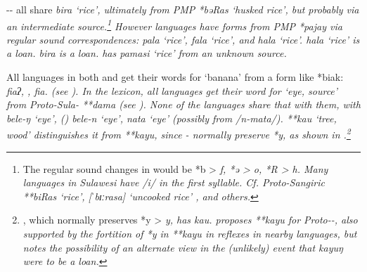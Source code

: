 -- all share \it{bira} ‘rice’,
ultimately from PMP *bəRas ‘husked rice’,
but probably via an intermediate source.\footnote{
		The regular
		sound changes in 
		would be *b > \it{f},
		*ə > \it{o}, *R > \it{h}.
		Many languages in Sulawesi have /i/ in the first syllable. Cf.
		Proto-Sangiric **biRas ‘rice’,  [ˈbɪːrasa] ‘uncooked rice’
		\citep[106]{GrimesGrimes1987}, and others.}
However  languages have forms from
PMP *pajay via regular sound correspondences:  \it{pala}
‘rice’,  \it{fala} ‘rice’, and   \it{hala} ‘rice’.
 \it{hala} ‘rice’ is a  loan.
 \it{bira} is a  loan.
 has \it{pamasi} ‘rice’ from an unknown source.

All languages in both 
and  get their words for ‘banana’ from a form
like *biak:  \it{fiaʔ},
,  \it{fia}. (see ).
In the lexicon, all  languages get their word
for ‘eye, source’ from Proto-Sula- **dama (see ).
None of the  languages share that with them,
with  \it{bele-ŋ} ‘eye’,
 () \it{bele-n} ‘eye’,
 \it{nata} ‘eye’ (possibly from /n-mata/).
 **kau ‘tree, wood’ distinguishes it from 
**kayu, since - normally preserve *y,
as shown in .\footnote{
		, which normally preserves *y > \it{y}, has \it{kau}.
		\citet[77]{Mead2003b} proposes **kayu for Proto--,
		also supported by the fortition of *y in **kayu in reflexes in
		nearby  languages, but notes the
		possibility of an alternate view in the (unlikely)
		event that  \it{kayuŋ} were to be a  loan.}



